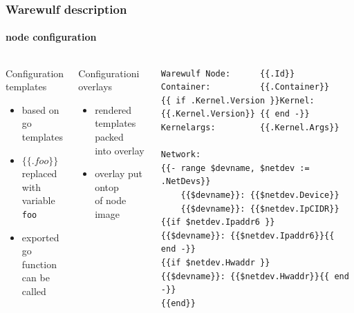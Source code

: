 \documentclass[aspectratio=169]{beamer}
\begin{document}
\begin{frame}[fragile]
\frametitle{Warewulf description}
\framesubtitle{node configuration}
\begin{columns}
\begin{block}{Configuration templates}
  \begin{itemize}
    \item based on go templates
    \item $\{\{ .foo \}\}$ replaced \\
    with variable \texttt{foo}
    \item exported go function \\
    can be called
  \end{itemize}
\end{block}
\begin{block}{Configurationi overlays}
\begin{itemize}
  \item rendered templates packed\\
  into overlay
  \item overlay put ontop \\
  of node image
\end{itemize}
\end{block}
\begin{lstlisting}[style=ww,caption=issue.ww]
Warewulf Node:      {{.Id}}
Container:          {{.Container}}
{{ if .Kernel.Version }}Kernel:             {{.Kernel.Version}} {{ end -}}
Kernelargs:         {{.Kernel.Args}}

Network:
{{- range $devname, $netdev := .NetDevs}}
    {{$devname}}: {{$netdev.Device}}
    {{$devname}}: {{$netdev.IpCIDR}}
{{if $netdev.Ipaddr6 }}    {{$devname}}: {{$netdev.Ipaddr6}}{{ end -}}
{{if $netdev.Hwaddr }}    {{$devname}}: {{$netdev.Hwaddr}}{{ end -}}
{{end}}
\end{lstlisting}
\end{columns}
\end{frame}
%
%
%
%
\end{document}
